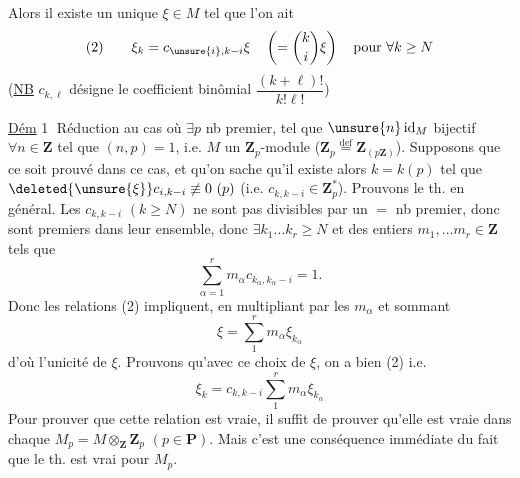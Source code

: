 Alors il existe un unique $\xi\in M$ tel que l'on ait
\[
(2)\qquad\xi_k=c_{\unsure{i},k-i}\xi\quad\left(=\binom{k}{i}\xi\right)\quad\text{pour }\forall k\geq N
\]
(\uline{NB} $c_{k,\ell}$ désigne le coefficient binômial $\dfrac{(k+\ell)!}{k!\ell!}$)

\uline{Dém} \textcircled{1} Réduction au cas où $\exists p$ nb premier, tel que $\unsure{n}\operatorname{id}_M$ bijectif $\forall n\in\mathbf Z$ tel que $(n,p)=1$, i.e. $M$ un $\mathbf Z_p$-module ($\mathbf Z_p\overset{\mathrm{def}}=\mathbf Z_{(p\mathbf Z)}$).
Supposons que ce soit prouvé dans ce cas, et qu'on sache qu'il existe alors $k=k(p)$ tel que $\deleted{\unsure{\xi}}c_{i,k-i}\not\equiv0\ (p)$ (i.e. $c_{k,k-i}\in\mathbf Z_p^*$). Prouvons le th. en général. Les $c_{k,k-i}$ $(k\geq N)$ ne sont pas divisibles par un $=$ nb premier, donc sont premiers dans leur ensemble, donc $\exists k_1\ldots k_r\geq N$ et des entiers $m_1,\ldots m_r\in\mathbf Z$ tels que
\[
\sum_{\alpha=1}^{r}m_\alpha c_{k_\alpha,k_\alpha-i}=1.
\]
Donc les relations (2) impliquent, en multipliant par les $m_\alpha$ et sommant
\[
\xi=\sum_1^r m_\alpha\xi_{k_\alpha}
\]
d'où l'unicité de $\xi$. Prouvons qu'avec ce choix de $\xi$, on a bien (2) i.e.
\[
\xi_k=c_{k,k-i}\sum_1^r m_\alpha\xi_{k_\alpha}
\]
Pour prouver que cette relation est vraie,  il suffit de prouver qu'elle est vraie dans chaque $M_p=M\otimes_{\mathbf Z}\mathbf Z_p$ $(p\in\mathbf P)$. Mais c'est une conséquence immédiate du fait que le th. est vrai pour $M_p$.

